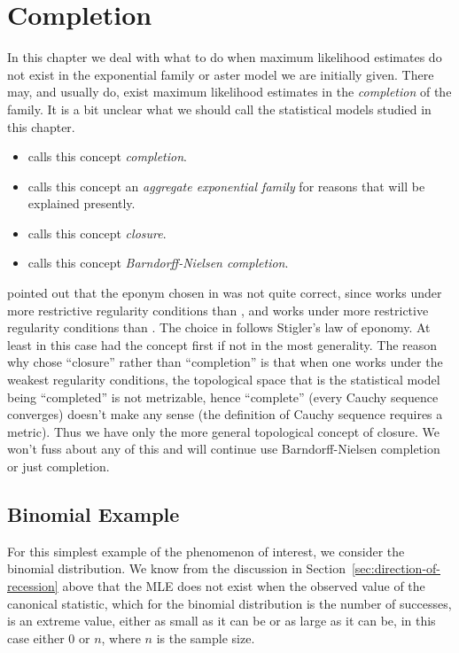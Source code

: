 
\chapter{Completion}

In this chapter we deal with what to do when maximum likelihood estimates
do not exist in the exponential family or aster model we are initially given.
There may, and usually do, exist maximum likelihood estimates in the
\emph{completion} of the family.  It is a bit unclear what we should call
the statistical models studied in this chapter.
\begin{itemize}
\item \citet[Sections~9.3 and~9.4]{barndorff-nielsen} calls this concept
    \emph{completion}.
\item \citet[Chapter~6]{brown} calls this concept
    an \emph{aggregate exponential family} for reasons that will be explained
    presently.
\item \citet[Chapters~2 and~4]{geyer-thesis} calls this concept
    \emph{closure}.
\item \citet{geyer-gdor} calls this concept
    \emph{Barndorff-Nielsen completion}.
\end{itemize}
\citeauthor[personal communication]{brown} pointed out that the eponym chosen
in \citet{geyer-gdor} was not quite correct, since \citet{barndorff-nielsen}
works under more restrictive regularity conditions than \citet{brown}, and
\citet{brown} works under more restrictive regularity conditions than
\citet{geyer-thesis}.  The choice in \citet{geyer-gdor} follows
Stigler's law of eponomy.  At least in this case \citeauthor{barndorff-nielsen}
had the concept first if not in the most generality.
The reason why \citet{geyer-thesis} chose ``closure'' rather than ``completion''
is that when one works under the weakest regularity conditions, the topological
space that is the statistical model being ``completed'' is not metrizable,
hence ``complete'' (every Cauchy sequence converges) doesn't make any sense
(the definition of Cauchy sequence requires a metric).  Thus we have only
the more general topological concept of closure.
We won't fuss about any of this and will continue use Barndorff-Nielsen
completion or just completion.

\section{Binomial Example}

For this simplest example of the phenomenon of interest, we consider the
binomial distribution.  We know from the discussion
in Section~\ref{sec:direction-of-recession} above that the MLE does not exist
when the observed value of the canonical statistic, which for the binomial
distribution is the number of successes, is an extreme value, either as small
as it can be or as large as it can be, in this case either 0 or $n$, where
$n$ is the sample size.

